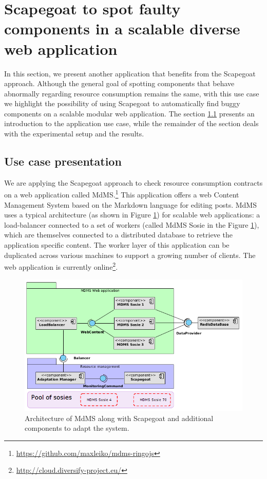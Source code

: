 \section{Scapegoat to spot faulty components in a scalable diverse web application}\label{sec:WebStudy}
In this section, we present another application that benefits from the Scapegoat approach.
Although the general goal of spotting components that behave abnormally regarding resource consumption remains the same, with this use case we highlight the possibility of using Scapegoat 
to automatically find buggy components on a scalable modular web application.
The section \ref{MdMS} presents an introduction to the application use case, while the remainder of the section deals with the experimental setup and the results.


\subsection{Use case presentation}\label{MdMS}
We are applying the Scapegoat approach to check resource consumption contracts on a web application called MdMS.\footnote{\url{https://github.com/maxleiko/mdms-ringojs}}
This application offers a web Content Management System based on the Markdown language for editing posts. 
MdMS uses a typical architecture (as shown in Figure \ref{fig:webapp}) for scalable web applications: a load-balancer connected to a set of workers (called MdMS Sosie in the Figure \ref{fig:webapp}), which are themselves connected to a distributed database to retrieve the application specific content.
The worker layer of this application can be duplicated across various machines to support a growing number of clients.
The web application is currently online\footnote{\url{http://cloud.diversify-project.eu/}}. 

\begin{figure}[!bt]
	\centering
	\includegraphics[scale=0.45]{./chapter5/figures/webapp2}
	\caption{\label{fig:webapp}Architecture of MdMS along with Scapegoat and additional components to adapt the system.}
\end{figure}

